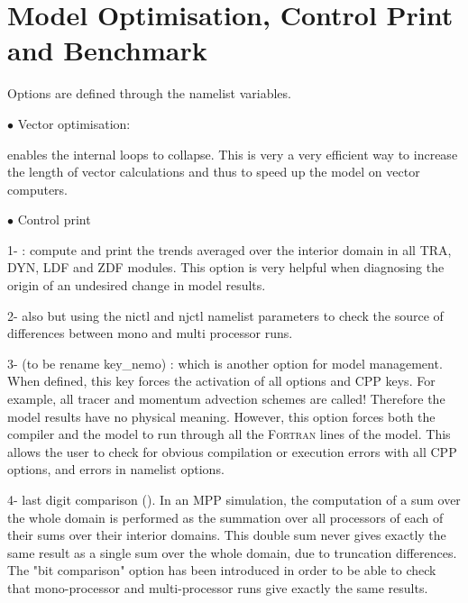 \documentclass[NEMO_book]{subfiles}
\begin{document}
\section{Model Optimisation, Control Print and Benchmark}
\label{MISC_opt}

Options are defined through the   namelist variables.

$\bullet$ Vector optimisation:

 enables the internal loops to collapse. This is very 
a very efficient way to increase the length of vector calculations and thus 
to speed up the model on vector computers.
 
 
 
$\bullet$ Control print %

1-  : compute and print the trends averaged over the interior domain 
in all TRA, DYN, LDF and ZDF modules. This option is very helpful when 
diagnosing the origin of an undesired change in model results. 

2- also  but using the nictl and njctl namelist parameters to check 
the source of differences between mono and multi processor runs.

3-  (to be rename key\_nemo) : which is another option for model 
management. When defined, this key forces the activation of all options and 
CPP keys. For example, all tracer and momentum advection schemes are called! 
Therefore the model results have no physical meaning. 
However, this option forces both the compiler and the model to run through 
all the \textsc{Fortran} lines of the model. This allows the user to check for obvious 
compilation or execution errors with all CPP options, and errors in namelist options.

4- last digit comparison (). In an MPP simulation, the computation of 
a sum over the whole domain is performed as the summation over all processors of 
each of their sums over their interior domains. This double sum never gives exactly 
the same result as a single sum over the whole domain, due to truncation differences. 
The "bit comparison" option has been introduced in order to be able to check that 
mono-processor and multi-processor runs give exactly the same results. 
\end{document}

